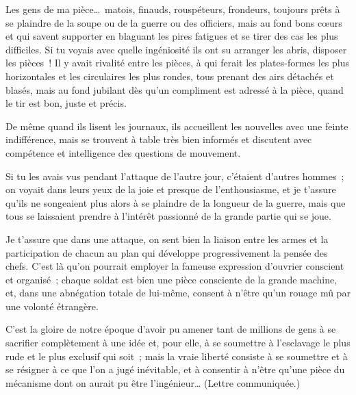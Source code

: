 \documentclass[french,twoside]{book} %
\newenvironment{quoteblock}%
  {\begin{quoting}}
  {\end{quoting}}
\newenvironment{quotebar}{%
    \def\FrameCommand{{\color{rubric!10!}\vrule width 0.5em} \hspace{0.9em}}%
    \def\OuterFrameSep{\itemsep} %
    \MakeFramed {\advance\hsize-\width \FrameRestore}
  }%
  {%
    \endMakeFramed
  }
\renewenvironment{quoteblock}%
  {%
    \savenotes
    \setstretch{0.9}
    \normalfont
    \begin{quotebar}
  }
  {%
    \end{quotebar}
    \spewnotes
  }
\begin{document}
\begin{quoteblock}
 \noindent Les gens de ma pièce… matois, finauds, rouspéteurs, frondeurs, toujours prêts à se plaindre de la soupe ou de la guerre ou des officiers, mais au fond bons cœurs et qui savent supporter en blaguant les pires fatigues et se tirer des cas les plus difficiles. Si tu voyais avec quelle ingéniosité ils ont su arranger les abris, disposer les pièces ! Il y avait rivalité entre les pièces, à qui ferait les plates-formes les plus horizontales et les circulaires les plus rondes, tous prenant des airs détachés et blasés, mais au fond jubilant dès qu’un compliment est adressé à la pièce, quand le tir est bon, juste et précis.‌\par
 De même quand ils lisent les journaux, ils accueillent les nouvelles avec une feinte indifférence, mais se trouvent à table très bien informés et discutent avec compétence et intelligence des questions de mouvement.‌\par
 Si tu les avais vus pendant l’attaque de l’autre jour, c’étaient d’autres hommes ; on voyait dans leurs yeux de la joie et presque de l’enthousiasme, et je t’assure qu’ils ne songeaient plus alors à se plaindre de la longueur de la guerre, mais que tous se laissaient prendre à l’intérêt passionné de la grande partie qui se joue.‌\par
 Je t’assure que dans une attaque, on sent bien la liaison entre les armes et la participation de chacun au plan qui développe progressivement la pensée des chefs. C’est là qu’on pourrait employer la fameuse expression d’ouvrier conscient et organisé ; chaque soldat est bien une pièce consciente de la grande machine, et, dans une abnégation totale de lui-même, consent à n’être qu’un rouage mû par une volonté étrangère.‌\par
 C’est la gloire de notre époque d’avoir pu amener tant de millions de gens à se sacrifier complètement à une idée et, pour elle, à se soumettre à l’esclavage le plus rude et le plus exclusif qui soit ; mais la vraie liberté consiste à se soumettre et à se résigner à ce que l’on a jugé inévitable, et à consentir à n’être qu’une pièce du mécanisme dont on aurait pu être l’ingénieur… (Lettre communiquée.)‌
 \end{quoteblock}
\end{document}
